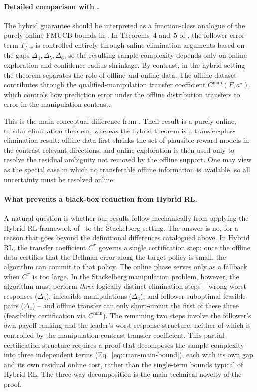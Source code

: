 \documentclass{article}
\begin{document}
\paragraph{Detailed comparison with \cite{yu2024decentralized}.}
The hybrid guarantee should be interpreted as a function-class analogue of the purely online FMUCB bounds in \cite{yu2024decentralized}. In Theorems~4 and~5 of \cite{yu2024decentralized}, the follower error term $T_{f,w}$ is controlled entirely through online elimination arguments based on the gaps $\Delta_4,\Delta_5,\Delta_6$, so the resulting sample complexity depends only on online exploration and confidence-radius shrinkage. By contrast, in the hybrid setting the theorem separates the role of offline and online data. The offline dataset contributes through the qualified-manipulation transfer coefficient $C^{\mathrm{man}}(F,a^\star)$, which controls how prediction error under the offline distribution transfers to error in the manipulation contrast.

This is the main conceptual difference from \cite{yu2024decentralized}. Their result is a purely online, tabular elimination theorem, whereas the hybrid theorem is a transfer-plus-elimination result: offline data first shrinks the set of plausible reward models in the contrast-relevant directions, and online exploration is then used only to resolve the residual ambiguity not removed by the offline support. One may view \cite{yu2024decentralized} as the special case in which no transferable offline information is available, so all uncertainty must be resolved online.

\paragraph{What prevents a black-box reduction from Hybrid RL.}
A natural question is whether our results follow mechanically from applying the Hybrid RL framework of~\cite{song2022hybrid} to the Stackelberg setting. The answer is no, for a reason that goes beyond the definitional differences catalogued above. In Hybrid RL, the transfer coefficient $C^\pi$ governs a single certification step: once the offline data certifies that the Bellman error along the target policy is small, the algorithm can commit to that policy. The online phase serves only as a fallback when $C^\pi$ is too large. In the Stackelberg manipulation problem, however, the algorithm must perform \emph{three} logically distinct elimination steps -- wrong worst responses ($\Delta_5$), infeasible manipulations ($\Delta_6$), and follower-suboptimal feasible pairs ($\Delta_4$) -- and offline transfer can only short-circuit the first of these three (feasibility certification via $C^{\mathrm{man}}$). The remaining two steps involve the follower's own payoff ranking and the leader's worst-response structure, neither of which is controlled by the manipulation-contrast transfer coefficient. This partial-certification structure requires a proof that decomposes the sample complexity into three independent terms (Eq.~\eqref{eq:cman-main-bound}), each with its own gap and its own residual online cost, rather than the single-term bounds typical of Hybrid RL. The three-way decomposition is the main technical novelty of the proof.
\end{document}
